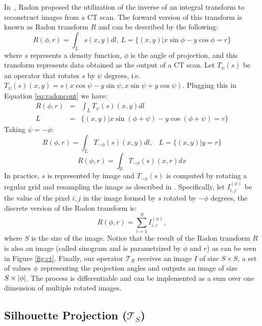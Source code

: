 In~\cite{radon}, Radon proposed the utilization of the inverse of an integral transform to reconstruct images from a CT scan.
The forward version of this transform is known as Radon transform $R$ and can be described by the following:
\begin{equation}
\label{eq:radoncont}
R(\phi, r) = \int_{L} s(x,y) dl \text{,~} L=\{(x, y) | x \sin\phi - y \cos\phi = r\}
\end{equation}
where $s$ represents a density function, $\phi$ is the angle of projection, and this transform represents data obtained as the output of a CT scan.
Let $T_\psi(s)$ be an operator that rotates $s$ by $\psi$ degrees, i.e. $T_\psi(s)(x,y) = s(x \cos\psi - y \sin\psi, x \sin\psi + y \cos\psi)$.
Plugging this in Equation \eqref{eq:radoncont} we have:
\begin{eqnarray}
R(\phi, r) &=& \int_{L} T_\psi(s)(x,y) dl \nonumber \\
L&=&\{(x, y) | x \sin(\phi + \psi) - y \cos(\phi + \psi) = r\} \nonumber
\end{eqnarray}
Taking $\psi = -\phi$:
\begin{equation}
R(\phi, r) = \int_{L} T_{-\phi}(s)(x,y) dl \text{,}\quad L=\{(x, y) | y = r\}
\end{equation}
\begin{equation}
R(\phi, r) = \int_{\mathds{R}} T_{-\phi}(s)(x,r) dx
\end{equation}
In practice, $s$ is represented by image and $T_{-\phi}(s)$ is computed by rotating a regular grid and resampling the image as described in \cite{STN}.
Specifically, let $I_{i,j}^{(\phi)}$ be the value of the pixel $i, j$ in the image formed by $s$ rotated by $-\phi$ degrees,
the discrete version of the Radon transform is:
\begin{equation}
R(\phi, r) = \sum_{i=1}^{S} I_{i,r}^{(\phi)}, 
\end{equation}
where $S$ is the size of the image. Notice that the result of the Radon transform $R$ is also an image (called sinogram and is parametrized by $\phi$ and $r$) as can be seen in Figure \ref{fig:ct}.
Finally, our operator $\mathcal{T}_R$ receives an image $I$ of size $S\times S$, a set of values $\bf{\phi}$ representing the projection angles and outputs an image of size $S \times |\bf{\phi}|$.
The process is differentiable and can be implemented as a sum over one dimension of multiple rotated images. 

\subsection{Silhouette Projection ($\mathcal{T}_S$)}

